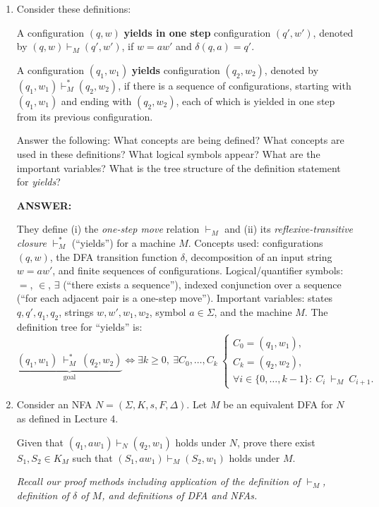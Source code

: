 \documentclass[12pt, letterpaper]{article}
\begin{document}
\begin{enumerate}
(All leaves reject on $0010$, so the string is not accepted.)

\item Consider these definitions:

A configuration $(q, w)$ \textbf{yields in one step} configuration $(q', w')$, denoted by $(q, w) \vdash_M (q', w')$, if $w = a w'$ and $\delta(q, a) = q'$. 

A configuration $(q_1, w_1)$ \textbf{yields} configuration $(q_2, w_2)$, denoted by $(q_1, w_1) \vdash_M^* (q_2, w_2)$, if there is a sequence of configurations, starting with $(q_1, w_1)$ and ending with $(q_2, w_2)$, each of which is yielded in one step from its previous configuration.

Answer the following: What concepts are being defined? What concepts are used in these definitions? What logical symbols appear? What are the important variables? What is the tree structure of the definition statement for \textit{yields}?

\noindent\textbf{ANSWER:}

They define (i) the \emph{one-step move} relation $\vdash_M$ and (ii) its \emph{reflexive-transitive closure} $\vdash_M^\ast$ (``yields'') for a machine $M$. Concepts used: configurations $(q,w)$, the DFA transition function $\delta$, decomposition of an input string $w = a w'$, and finite sequences of configurations. Logical/quantifier symbols: $=$, $\in$, $\exists$ (``there exists a sequence''), indexed conjunction over a sequence (``for each adjacent pair is a one-step move''). Important variables: states $q,q',q_1,q_2$, strings $w,w',w_1,w_2$, symbol $a\in\Sigma$, and the machine $M$. The definition tree for ``yields'' is:
\[
\underbrace{(q_1,w_1)\ \vdash_M^\ast\ (q_2,w_2)}_{\text{goal}}
\iff
\exists k\!\ge\!0,\ \exists C_0,\dots,C_k\ 
\begin{cases}
C_0=(q_1,w_1),\\
C_k=(q_2,w_2),\\
\forall i\in\{0,\dots,k-1\}:\ C_i\ \vdash_M\ C_{i+1}.
\end{cases}
\]

\item Consider an NFA $N = (\Sigma, K, s, F, \Delta)$. Let $M$ be an equivalent DFA for $N$ as defined in Lecture 4. 

Given that $(q_1, aw_1) \vdash_N (q_2, w_1)$ holds under $N$, prove there exist $S_1, S_2 \in K_M$ such that $(S_1, aw_1) \vdash_M (S_2, w_1)$ holds under $M$. 

\textit{Recall our proof methods including application of the definition of $\vdash_M$, definition of $\delta$ of $M$, and definitions of DFA and NFAs.}


\end{enumerate}
\end{document}
